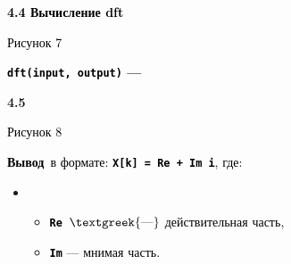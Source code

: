 \documentclass[a4paper]{article}
\newcommand\textstyleStrongEmphasis[1]{\textbf{#1}}
\newcommand\textstyleSourceText[1]{\texttt{#1}}
\newcommand\textstyleBulletSymbols[1]{\textrm{#1}}
\renewcommand\thepage{\arabic{page}}
\begin{document}
\bigskip

{\bfseries
\textcolor{black}{4.4 Вычисление }\foreignlanguage{english}{\textcolor{black}{dft}}}


\bigskip


\bigskip



\begin{center}
\end{center}

\bigskip

{\centering{}
\textcolor{black}{Рисунок 7}
\par}


\bigskip


\bigskip

{\bfseries
\textstyleStrongEmphasis{\textstyleSourceText{\foreignlanguage{english}{\textrm{\textcolor{black}{dft(input,
output)}}}}}\foreignlanguage{english}{\textmd{\textcolor{black}{ — }}}}

{\centering{}\bfseries\color{black}
\thepage{}
\par}


\bigskip


\bigskip


\bigskip

{\bfseries\color{black}
4.5 }


\bigskip



\begin{center}
\end{center}
{\centering{}
\textcolor{black}{Рисунок 8}
\par}


\bigskip


\bigskip

{
\textstyleStrongEmphasis{\textcolor{black}{Вывод}}\textcolor{black}{ в формате:\newline
}\textstyleSourceText{\textrm{\textbf{\textcolor{black}{X[k] = Re + Im i}}}}\textcolor{black}{, где:}}

\begin{itemize}[series=listLvii,label=\textstyleBulletSymbols{•}]
\item \begin{itemize}[series=listLvii,label=\textstyleBulletSymbols{•}]
\item \textstyleSourceText{\textrm{\textbf{\textcolor{black}{Re }}}}\textcolor{black}{$\text{\textgreek{—}}$
действительная часть,}
\item \textstyleSourceText{\textrm{\textbf{\textcolor{black}{Im}}}}\textcolor{black}{ — мнимая часть.}
\end{itemize}
\end{itemize}
\end{document}
